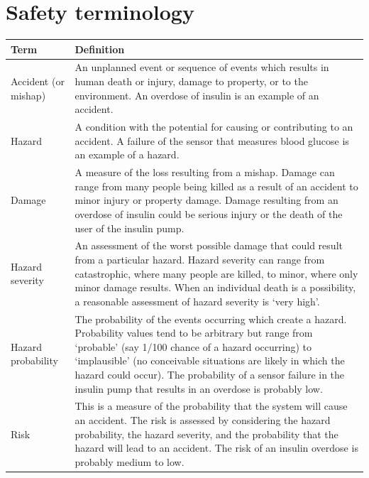 \section{Safety terminology}
\begin{table}[h!]
\centering
\begin{tabular}{ |p{3cm}|p{8cm}|  }
\hline
Term & Definition \\
\hline
\hline
Accident (or mishap) & An unplanned event or sequence of events which results in human death or injury, damage to property, or to the environment. An overdose of insulin is an example of an accident.\\
 \hline
Hazard & A condition with the potential for causing or contributing to an accident. A failure of the sensor that measures blood glucose is an example of a hazard.\\
\hline
Damage & A measure of the loss resulting from a mishap. Damage can range from many people being killed as a result of an accident to minor injury or property damage. Damage resulting from an overdose of insulin could be serious injury or the death of the user of the insulin pump.\\
\hline
Hazard severity & An assessment of the worst possible damage that could result from a particular hazard. Hazard severity can range from catastrophic, where many people are killed, to minor, where only minor damage results. When an individual death is a possibility, a reasonable assessment of hazard severity is ‘very high’.\\
\hline
Hazard probability & The probability of the events occurring which create a hazard. Probability values tend to be arbitrary but range from ‘probable’ (say 1/100 chance of a hazard occurring) to ‘implausible’ (no conceivable situations are likely in which the hazard could occur). The probability of a sensor failure in the insulin pump that results in an overdose is probably low.\\
\hline
Risk & This is a measure of the probability that the system will cause an accident. The risk is assessed by considering the hazard probability, the hazard severity, and the probability that the hazard will lead to an accident. The risk of an insulin overdose is probably medium to low.\\
\hline
\end{tabular}

\label{table:T4_2}
\end{table}

